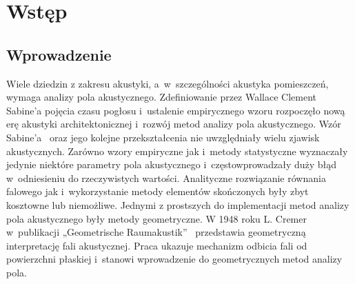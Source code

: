 \chapter{Wstęp}\label{cha:wstep}


\section{Wprowadzenie}\label{sec:wprowadzenie}

Wiele  dziedzin z zakresu akustyki, a~w~szczególności akustyka pomieszczeń, wymaga analizy pola akustycznego. Zdefiniowanie przez Wallace Clement Sabine’a pojęcia czasu pogłosu i~ustalenie empirycznego wzoru rozpoczęło nową erę akustyki architektonicznej i~rozwój metod analizy pola akustycznego. Wzór Sabine'a~\cite{b1} oraz jego kolejne przekształcenia nie uwzględniały wielu zjawisk akustycznych. Zarówno wzory empiryczne  jak i~metody statystyczne wyznaczały jedynie niektóre parametry pola akustycznego i~częstowprowadzały duży błąd w~odniesieniu do rzeczywistych wartości. Analityczne rozwiązanie równania falowego  jak i~wykorzystanie metody elementów skończonych były zbyt kosztowne lub niemożliwe. Jednymi z prostszych do implementacji metod analizy pola akustycznego były metody geometryczne. W 1948 roku L. Cremer w~publikacji „Geometrische Raumakustik”~\cite{b2} przedstawia geometryczną interpretację fali akustycznej. Praca ukazuje mechanizm odbicia fali od powierzchni płaskiej i~stanowi wprowadzenie do geometrycznych metod analizy pola.

